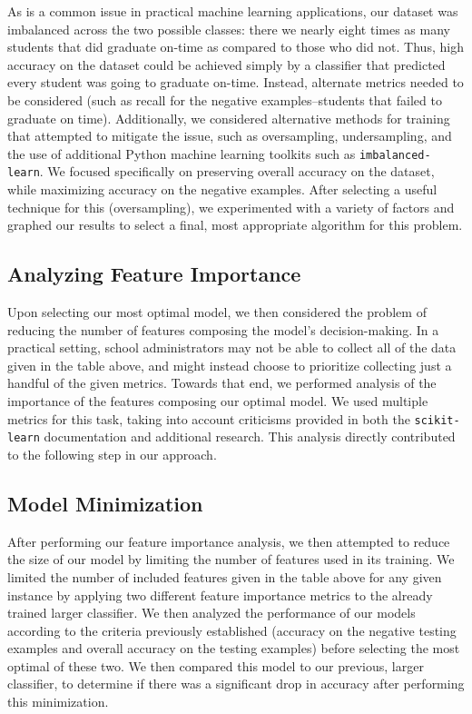 \documentclass[conference]{IEEEtran}
\begin{document}
As is a common issue in practical machine learning applications, our dataset was imbalanced across the two possible classes: there we nearly eight
times as many students that did graduate on-time as compared to those who did not. Thus, high accuracy on the dataset could be achieved simply by
a classifier that predicted every student was going to graduate on-time. Instead, alternate metrics needed to be considered (such as recall for the negative
examples--students that failed to graduate on time). Additionally, we considered alternative methods for training that attempted to mitigate the issue, such
as oversampling, undersampling, and the use of additional Python machine learning toolkits such as \texttt{imbalanced-learn}. We focused specifically on
preserving overall accuracy on the dataset, while maximizing accuracy on the negative examples. After selecting a useful technique for this (oversampling), 
we experimented with a variety of factors and graphed our results to select a final, most appropriate algorithm for this problem. \\

\subsection{Analyzing Feature Importance}

Upon selecting our most optimal model, we then considered the problem of reducing the number of features composing the model's decision-making. In a 
practical setting, school administrators may not be able to collect all of the data given in the table above, and might instead choose to prioritize collecting 
just a handful of the given metrics. Towards that end, we performed analysis of the importance of the features composing our optimal model. We used multiple 
metrics for this task, taking into account criticisms provided in both the \texttt{scikit-learn} documentation and additional research. This analysis directly contributed
to the following step in our approach.\\

\subsection{Model Minimization}

After performing our feature importance analysis, we then attempted to reduce the size of our model by limiting the number of features used in its training. We limited
the number of included features given in the table above for any given instance by applying two different feature importance metrics to the already trained larger classifier.
We then analyzed the performance of our models according to the criteria previously established (accuracy on the negative testing examples and overall accuracy on the
testing examples) before selecting the most optimal of these two. We then compared this model to our previous, larger classifier, to determine if there was a significant drop
in accuracy after performing this minimization.\\
\end{document}
